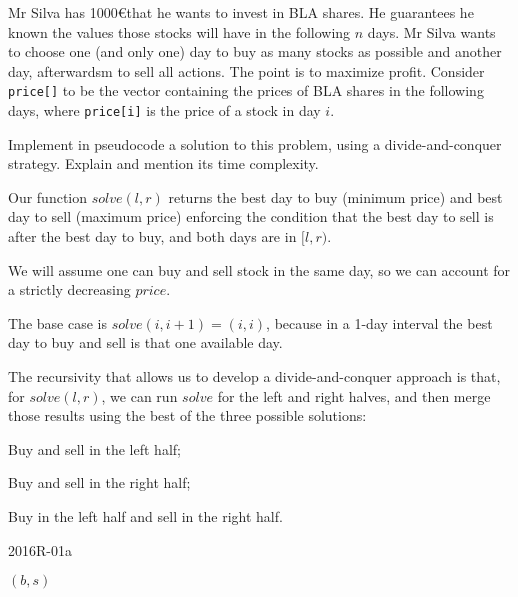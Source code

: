 {
\renewcommand{\thechapter}{\arabic{chapter}R}
\setcounter{chapter}{15}

Mr Silva has 1000\euro that he wants to invest in BLA shares. He guarantees he known the values those stocks will have in the following $n$ days. Mr Silva wants to choose one (and only one) day to buy as many stocks as possible and another day, afterwardsm to sell all actions. The point is to maximize profit. Consider \texttt{price[]} to be the vector containing the prices of BLA shares in the following days, where \texttt{price[i]} is the price of a stock in day $i$.

Implement in pseudocode a solution to this problem, using a divide-and-conquer strategy. Explain and mention its time complexity.

\ansseparator

Our function $solve(l,r)$ returns the best day to buy (minimum price) and best day to sell (maximum price) enforcing the condition that the best day to sell is after the best day to buy, and both days are in $[l,r)$.

We will assume one can buy and sell stock in the same day, so we can account for a strictly decreasing $price$.

The base case is $solve(i, i+1)=(i,i)$, because in a 1-day interval the best day to buy and sell is that one available day.

The recursivity that allows us to develop a divide-and-conquer approach is that, for $solve(l,r)$, we can run $solve$ for the left and right halves, and then merge those results using the best of the three possible solutions:
\begin{enumerate*}
    \item Buy and sell in the left half;
    \item Buy and sell in the right half;
    \item Buy in the left half and sell in the right half.
\end{enumerate*}

\begin{algorithm}[H]
    \caption{2016R-01a}
    \begin{algorithmic}[1]
            \EndIf
            \EndIf
            \EndIf
            \EndIf
            \State \Return $(b, s)$
        \EndFunction
    \end{algorithmic}
\end{algorithm}

}
